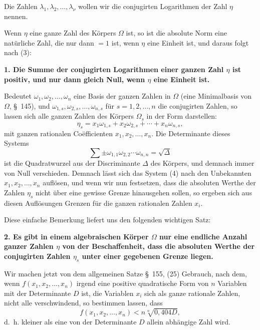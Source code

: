 \documentclass[11pt]{article}
\begin{document}
Die Zahlen $\lambda_1,\lambda_2,\ldots,\lambda_\nu$ wollen wir die conjugirten Logarithmen der Zahl $\eta$ nennen.

Wenn $\eta$ eine ganze Zahl des Körpers $\Omega$ ist, so ist die absolute Norm eine natürliche Zahl, die nur dann $=1$ ist, wenn $\eta$ eine Einheit ist, und daraus folgt nach (3):

\textbf{1. Die Summe der conjugirten Logarithmen einer ganzen Zahl $\eta$ ist positiv, und nur dann gleich Null, wenn $\eta$ eine Einheit ist.}

Bedeutet $\omega_1,\omega_2,\ldots,\omega_n$ eine Basis der ganzen Zahlen in $\Omega$ (eine Minimalbasis von $\Omega$, \S~145), und $\omega_{1,s},\omega_{2,s},\ldots,\omega_{n,s}$ für $s=1,2,\ldots,n$ die conjugirten Zahlen, so lassen sich alle ganzen Zahlen des Körpers $\Omega_s$ in der Form darstellen:
\begin{equation}
\eta_s=x_1\omega_{1,s}+x_2\omega_{2,s}+\cdots+x_n\omega_{n,s},
\tag{4}
\end{equation}
mit ganzen rationalen Coëfficienten $x_1,x_2,\ldots,x_n$. Die Determinante dieses Systems
\[
\sum \pm \omega_{1,1}\omega_{2,2}\cdots\omega_{n,n}=\sqrt{\Delta}
\]
ist die Quadratwurzel aus der Discriminante $\Delta$ des Körpers, und demnach immer von Null verschieden. Demnach lässt sich das System (4) nach den Unbekannten $x_1,x_2,\ldots,x_n$ auflösen, und wenn wir nun festsetzen, dass die absoluten Werthe der Zahlen $\eta_s$ nicht über eine gewisse Grenze hinausgehen sollen, so ergeben sich aus diesen Auflösungen Grenzen für die ganzen rationalen Zahlen $x_i$.

Diese einfache Bemerkung liefert uns den folgenden wichtigen Satz:

\textbf{2. Es gibt in einem algebraischen Körper $\Omega$ nur eine endliche Anzahl ganzer Zahlen $\eta$ von der Beschaffenheit, dass die absoluten Werthe der conjugirten Zahlen $\eta_s$ unter einer gegebenen Grenze liegen.}

Wir machen jetzt von dem allgemeinen Satze \S~155, (25) Gebrauch, nach dem, wenn $f(x_1,x_2,\ldots,x_n)$ irgend eine positive quadratische Form von $n$ Variablen mit der Determinante $D$ ist, die Variablen $x_i$ sich als ganze rationale Zahlen, nicht alle verschwindend, so bestimmen lassen, dass
\[
f(x_1,x_2,\ldots,x_n)< n\sqrt[n]{0{,}404D},
\]
d.~h. kleiner als eine von der Determinante $D$ allein abhängige Zahl wird.
\end{document}
